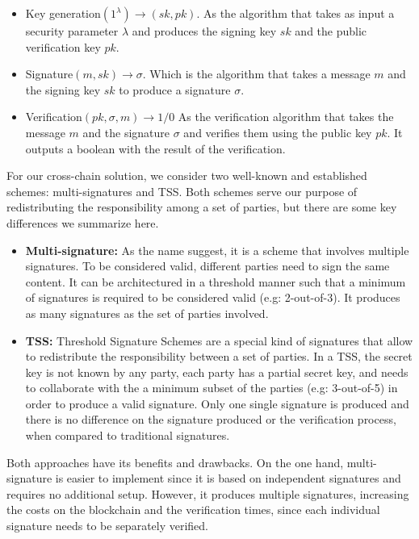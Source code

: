 \begin{itemize}
    \item Key generation$(1^{\lambda}) \rightarrow (sk,pk)$. As the algorithm that takes as input a security parameter $\lambda$ and produces the signing key $sk$ and the public verification key $pk$.
    
    \item Signature$(m, sk) \rightarrow \sigma$. Which is the algorithm that takes a message $m$ and the signing key $sk$ to produce a signature $\sigma$.
    
    \item Verification$(pk,\sigma, m) \rightarrow 1/0$ As the verification algorithm that takes the message $m$ and the signature $\sigma$ and verifies them using the public key $pk$. It outputs a boolean with the result of the verification.
\end{itemize}

For our cross-chain solution, we consider two well-known and established schemes: multi-signatures and TSS. Both schemes serve our purpose of redistributing the responsibility among a set of parties, but there are some key differences we summarize here. 

\begin{itemize}
    \item \textbf{Multi-signature:} As the name suggest, it is a scheme that involves multiple signatures. To be considered valid, different parties need to sign the same content. It can be architectured in a threshold manner such that a minimum of signatures is required to be considered valid (e.g: 2-out-of-3). It produces as many signatures as the set of parties involved.
    
    \item \textbf{TSS:} Threshold Signature Schemes \cite{Gennaro2019FastSetup, Canetti2021UCAbortsb} are a special kind of signatures that allow to redistribute the responsibility between a set of parties. In a TSS, the secret key is not known by any party, each party has a partial secret key, and needs to collaborate with the a minimum subset of the parties (e.g: 3-out-of-5) in order to produce a valid signature. Only one single signature is produced and there is no difference on the signature produced or the verification process, when compared to traditional signatures.
\end{itemize}

Both approaches have its benefits and drawbacks. On the one hand, multi-signature is easier to implement since it is based on independent signatures and requires no additional setup. However, it produces multiple signatures, increasing the costs on the blockchain and the verification times, since each individual signature needs to be separately verified.

